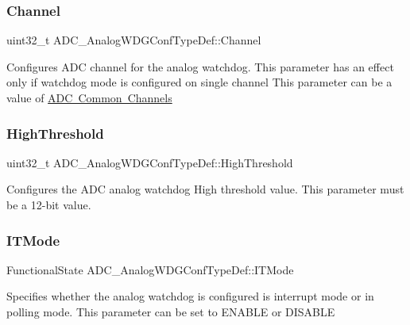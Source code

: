 \subsubsection{\texorpdfstring{Channel}{Channel}}
{\footnotesize\ttfamily uint32\+\_\+t A\+D\+C\+\_\+\+Analog\+W\+D\+G\+Conf\+Type\+Def\+::\+Channel}

Configures A\+DC channel for the analog watchdog. This parameter has an effect only if watchdog mode is configured on single channel This parameter can be a value of \mbox{\hyperlink{group___a_d_c__channels}{A\+DC Common Channels}} \mbox{\label{struct_a_d_c___analog_w_d_g_conf_type_def_a9bee62b3d364713a16a15cefcc217e65}} 
\subsubsection{\texorpdfstring{HighThreshold}{HighThreshold}}
{\footnotesize\ttfamily uint32\+\_\+t A\+D\+C\+\_\+\+Analog\+W\+D\+G\+Conf\+Type\+Def\+::\+High\+Threshold}

Configures the A\+DC analog watchdog High threshold value. This parameter must be a 12-\/bit value. \mbox{\label{struct_a_d_c___analog_w_d_g_conf_type_def_a3bdb322d2f20ec5b94ae50ad954618af}} 
\subsubsection{\texorpdfstring{ITMode}{ITMode}}
{\footnotesize\ttfamily Functional\+State A\+D\+C\+\_\+\+Analog\+W\+D\+G\+Conf\+Type\+Def\+::\+I\+T\+Mode}

Specifies whether the analog watchdog is configured is interrupt mode or in polling mode. This parameter can be set to E\+N\+A\+B\+LE or D\+I\+S\+A\+B\+LE \mbox{\label{struct_a_d_c___analog_w_d_g_conf_type_def_a77e1743ebd27333ac2c9de55a25cd4c8}} 

